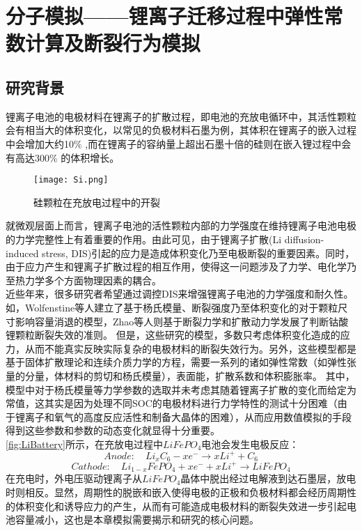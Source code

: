 \chapter{分子模拟——锂离子迁移过程中弹性常数计算及断裂行为模拟}
\section{研究背景}
锂离子电池的电极材料在锂离子的扩散过程，即电池的充放电循环中，其活性颗粒会有相当大的体积变化，以常见的负极材料石墨为例，其体积在锂离子的嵌入过程中会增加大约10\% \cite{Dahn1991Phase},而在锂离子的容纳量上超出石墨十倍的硅则在嵌入锂过程中会有高达300\% 的体积增长\cite{Beaulieu2003The}。
\begin{figure}
\centering   
\texttt{[image: Si.png]}
\caption{硅颗粒在充放电过程中的开裂\cite{Beaulieu2003The}} 
\label{fig:Si}
\end{figure}
就微观层面上而言，锂离子电池的活性颗粒内部的力学强度在维持锂离子电池电极的力学完整性上有着重要的作用\cite{Lee2014Molecular}。由此可见，由于锂离子扩散(Li diffusion-induced stress, DIS)引起的应力是造成体积变化乃至电极断裂的重要因素。同时，由于应力产生和锂离子扩散过程的相互作用，使得这一问题涉及了力学、电化学乃至热力学多个方面物理因素的耦合。\\
\indent 近些年来，很多研究者希望通过调控DIS来增强锂离子电池的力学强度和耐久性\cite{Christensen2005A,Christensen2006Stress,Zhang2007Numerical,Verbrugge2009Stress,Cheng2008The,Zhang2008Intercalation}。如，Wolfenstine等人建立了基于杨氏模量、断裂强度乃至体积变化的对于颗粒尺寸影响容量消退的模型\cite{Woodford2010}，Zhao等人则基于断裂力学和扩散动力学发展了判断钴酸锂颗粒断裂失效的准则\cite{Zhao2010Fracture}。 但是，这些研究的模型，多数只考虑体积变化造成的应力，从而不能真实反映实际复杂的电极材料的断裂失效行为。另外，这些模型都是基于固体扩散理论和连续介质力学的方程，需要一系列的诸如弹性常数（如弹性张量的分量，体材料的剪切和杨氏模量），表面能，扩散系数和体积膨胀率。 其中，模型中对于杨氏模量等力学参数的选取并未考虑其随着锂离子扩散的变化而给定为常值，这其实是因为处理不同SOC的电极材料进行力学特性的测试十分困难（由于锂离子和氧气的高度反应活性和制备大晶体的困难），从而应用数值模拟的手段得到这些参数和参数的动态变化就显得十分重要。\\
\ref{fig:LiBattery}所示，在充放电过程中$LiFePO_4$电池会发生电极反应：
\begin{equation}
\label{eq:anode}
Anode : \quad Li_xC_6 -x e^{-} \to x Li^{+} +C_6
\end{equation}
\begin{equation}
\label{eq:cathode}
Cathode : \quad Li_{1-x}FePO_4 +x e^{-} + x Li^{+} \to LiFePO_4
\end{equation}
\indent 在充电时，外电压驱动锂离子从$LiFePO_4$晶体中脱出经过电解液到达石墨层，放电时则相反。显然，周期性的脱嵌和嵌入使得电极的正极和负极材料都会经历周期性的体积变化和诱导应力的产生，从而有可能造成电极材料的断裂失效进一步引起电池容量减小，这也是本章模拟需要揭示和研究的核心问题。

